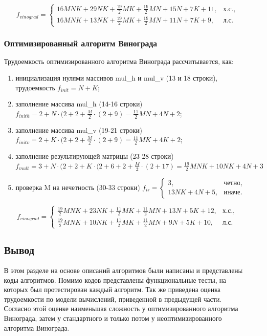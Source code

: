 \documentclass{article}
\begin{document}
\begin{equation}
	\label{topic:vinograd}
	f_{vinograd} = \begin{cases} 16MNK + 29NK + \frac{19}{2}MK + \frac{19}{2}MN + 15N + 7K + 11, & \text{х.с.,}\\
						16MNK + 13NK + \frac{19}{2}MK + \frac{19}{2}MN + 11N + 7K + 9, & \text{л.с.}
			    \end{cases}
\end{equation}

\subsubsection{Оптимизированный алгоритм Винограда}
Трудоемкость оптимизированного алгоритма Винограда рассчитывается, как:
\begin{enumerate}
	\item инициализация нулями массивов mul\_h и mul\_v (13 и 18 строки), трудоемкость $f_{init} = N + K$;
	\item заполнение массива mul\_h (14-16 строки) $f_{inith} = 2 + N \cdot (2 + 2 + \frac{M}{2} \cdot (2 + 9) =
 \frac{11}{2}MN +4N + 2$;
	\item заполнение массива mul\_v (19-21 строки) $f_{initv} = 2 + K \cdot (2 + 2 + \frac{M}{2} \cdot (2 + 9) =
 \frac{11}{2}MK +4K + 2$;
	\item заполнение результирующей матрицы (23-28 строки) $f_{mult} = 3 + N \cdot (2 + 2 + K \cdot (2 + 6 + 2 + \frac{M}{2}
 \cdot (2 + 17) = \frac{19}{2}MNK + 10NK +4N + 3$
 	\item проверка M на нечетность (30-33 строки) $f_{is} = \begin{cases} 3, & \text{четно,}\\
 													13NK + 4N + 5, & \text{иначе.}\end{cases}$
\end{enumerate}

\begin{equation}
	\label{topic:vinograd}
	f_{vinograd} = \begin{cases} \frac{19}{2}MNK + 23NK + \frac{11}{2}MK + \frac{11}{2}MN + 13N + 5K + 12, & \text{х.с.,}\\
					       \frac{19}{2}MNK + 10NK + \frac{11}{2}MK + \frac{11}{2}MN + 9N + 5K + 10, & \text{л.с.}
			    \end{cases}
\end{equation}

\subsection{Вывод}
В этом разделе на основе описаний алгоритмов были написаны и представлены коды алгоритмов. Помимо кодов
представлены функциональные тесты, на которых был протестирован каждый алгоритм. Так же приведена оценка
трудоемкости по модели вычислений, приведенной в предыдущей части. Согласно этой оценке наименьшая сложность
у оптимизированного алгоритма Винограда, затем у стандартного и только потом у неоптимизированного алгоритма
Винограда.
\end{document}
